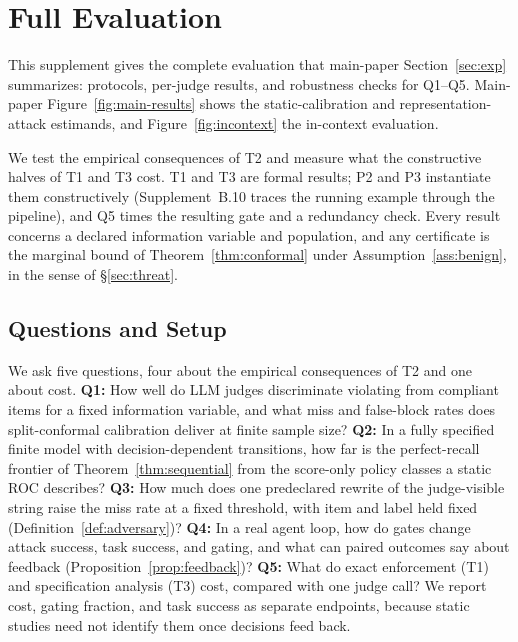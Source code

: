 \section{Full Evaluation}\label{suppE:exp}
This supplement gives the complete evaluation that main-paper Section~\ref{sec:exp} summarizes:
protocols, per-judge results, and robustness checks for Q1--Q5. Main-paper Figure~\ref{fig:main-results}
shows the static-calibration and representation-attack estimands, and Figure~\ref{fig:incontext} the in-context
evaluation.



We test the empirical consequences of T2 and measure what the constructive
halves of T1 and T3 cost. T1 and T3 are formal results; P2 and P3 instantiate
them constructively (Supplement~B.10 traces the running example through the
pipeline), and Q5 times the resulting gate and a redundancy check. Every result
concerns a declared information variable and population, and any certificate
is the marginal bound of Theorem~\ref{thm:conformal} under
Assumption~\ref{ass:benign}, in the sense of \S\ref{sec:threat}.

\subsection{Questions and Setup}\label{suppE:setup}

We ask five questions, four about the empirical consequences of T2 and one about cost.
\textbf{Q1:} How well do LLM judges discriminate violating from compliant items
for a fixed information variable, and what miss and false-block rates does
split-conformal calibration deliver at finite sample size? \textbf{Q2:} In a fully
specified finite model with decision-dependent transitions, how far is the
perfect-recall frontier of Theorem~\ref{thm:sequential} from the score-only policy
classes a static ROC describes? \textbf{Q3:} How much does one predeclared rewrite
of the judge-visible string raise the miss rate at a fixed threshold, with item
and label held fixed (Definition~\ref{def:adversary})? \textbf{Q4:} In a real
agent loop, how do gates change attack success, task success, and gating, and
what can paired outcomes say about feedback (Proposition~\ref{prop:feedback})?
\textbf{Q5:} What do exact enforcement (T1) and specification analysis (T3)
cost, compared with one judge call?
We report cost, gating fraction, and task success as separate endpoints,
because static studies need not identify them once decisions feed back.

